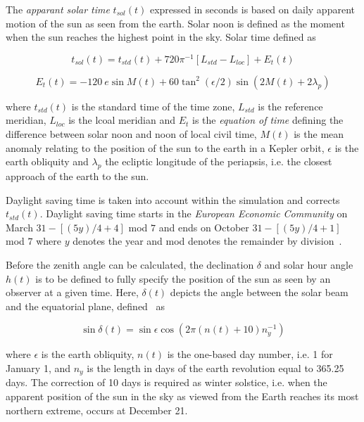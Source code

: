 \documentclass{book}
\begin{document}
The \emph{apparant solar time} $t_{sol}(t)$ expressed in seconds is based on daily apparent motion of the sun as seen from the earth. Solar noon is defined as the moment when the sun reaches the highest point in the sky. Solar time defined as

\begin{equation}
t_{sol}(t) = t_{std}(t) + 720\pi^{-1}\left[L_{std}-L_{loc}\right] + E_{t}(t)
\end{equation}

\begin{equation}
E_{t}(t) = -120\ e\sin M(t) + 60\tan^{2} \left(\epsilon/2\right) \sin \left(2M(t)+2\lambda_{p}\right)
\end{equation}

where $t_{std}(t)$ is the standard time of the time zone, $L_{std}$ is the reference meridian, $L_{loc}$ is the lcoal meridian and $E_{t}$ is the \emph{equation of time} defining the difference between solar noon and noon of local civil time, $M(t)$ is the mean anomaly relating to the position of the sun to the earth in a Kepler orbit, $\epsilon$ is the earth obliquity and $\lambda_{p}$ the ecliptic longitude of the periapsis, i.e. the closest approach of the earth to the sun.

Daylight saving time is taken into account within the simulation and corrects $t_{std}(t)$. Daylight saving time starts in the \emph{European Economic Community} on March $31-\left[(5y)/4+4\right]$ mod $7$ and ends on October $31-\left[(5y)/4+1\right]$ mod $7$ where $y$ denotes the year and mod denotes the remainder by division~\cite{VanGent2011}.

Before the zenith angle can be calculated, the declination $\delta$ and solar hour angle $h(t)$ is to be defined to fully specify the position of the sun as seen by an observer at a given time. Here, $\delta(t)$ depicts the angle between the solar beam and the equatorial plane, defined~\cite{Spencer1971} as 

\begin{equation}
\sin \delta(t) = \sin \epsilon \cos \left(2\pi \left(n(t)+10\right) n_{y}^{-1} \right)
\end{equation}

where $\epsilon$ is the earth obliquity, $n(t)$ is the one-based day number, i.e. 1 for January 1, and $n_{y}$ is the length in days of the earth revolution equal to 365.25 days. The correction of 10 days is required as winter solstice, i.e. when the apparent position of the sun in the sky as viewed from the Earth reaches its most northern extreme, occurs at December 21. 
\end{document}
